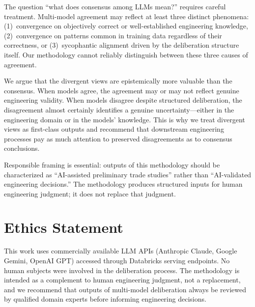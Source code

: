 \documentclass[11pt,a4paper]{article}
\begin{document}
The question ``what does consensus among LLMs mean?'' requires careful treatment. Multi-model agreement may reflect at least three distinct phenomena: (1)~convergence on objectively correct or well-established engineering knowledge, (2)~convergence on patterns common in training data regardless of their correctness, or (3)~sycophantic alignment driven by the deliberation structure itself. Our methodology cannot reliably distinguish between these three causes of agreement.

We argue that the divergent views are epistemically more valuable than the consensus. When models agree, the agreement may or may not reflect genuine engineering validity. When models disagree despite structured deliberation, the disagreement almost certainly identifies a genuine uncertainty---either in the engineering domain or in the models' knowledge. This is why we treat divergent views as first-class outputs and recommend that downstream engineering processes pay as much attention to preserved disagreements as to consensus conclusions.

Responsible framing is essential: outputs of this methodology should be characterized as ``AI-assisted preliminary trade studies'' rather than ``AI-validated engineering decisions.'' The methodology produces structured inputs for human engineering judgment; it does not replace that judgment.

\section{Ethics Statement}
\label{sec:ethics}

This work uses commercially available LLM APIs (Anthropic Claude, Google Gemini, OpenAI GPT) accessed through Databricks serving endpoints. No human subjects were involved in the deliberation process. The methodology is intended as a complement to human engineering judgment, not a replacement, and we recommend that outputs of multi-model deliberation always be reviewed by qualified domain experts before informing engineering decisions.
\end{document}
